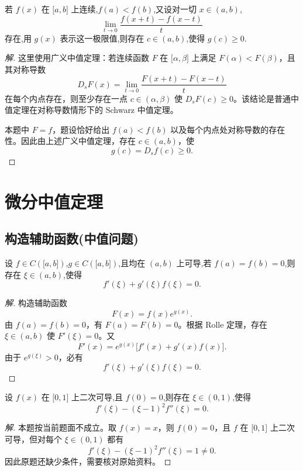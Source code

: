 \documentclass[../../数学分析培优讲义(答案版).tex]{subfiles}
\begin{document}
\begin{example}
若 $f(x)$ 在 $\lbrack a,b\rbrack$ 上连续,$f(a)<f(b)$,又设对一切 $x\in(a,b)$,
\[
    \lim\limits_{t\to0}\dfrac{f(x+t)-f(x-t)}{t}
\]
存在,用 $g(x)$ 表示这一极限值,则存在 $c\in(a,b)$,使得 $g(c)\geq0$.
\end{example}

\begin{proof}[解]
这里使用广义中值定理：若连续函数 $F$ 在 $\lbrack\alpha,\beta\rbrack$ 上满足 $F(\alpha)<F(\beta)$，且其对称导数
\[
    D_sF(x)=\lim\limits_{t\to0}\dfrac{F(x+t)-F(x-t)}{t}
\]
在每个内点存在，则至少存在一点 $c\in(\alpha,\beta)$ 使 $D_sF(c)\geq0$。该结论是普通中值定理在对称导数情形下的 Schwarz 中值定理。

本题中 $F=f$，题设恰好给出 $f(a)<f(b)$ 以及每个内点处对称导数的存在性。因此由上述广义中值定理，存在 $c\in(a,b)$，使
\[
    g(c)=D_sf(c)\geq0.
\]
\end{proof}

\newpage

\section{微分中值定理}

\subsection{构造辅助函数(中值问题)}

\begin{example}
设 $f\in C(\lbrack a,b\rbrack)$,$g\in C(\lbrack a,b\rbrack)$,且均在 $(a,b)$ 上可导,若 $f(a)=f(b)=0$,则存在 $\xi\in(a,b)$,使得
\[
    f'(\xi)+g'(\xi)f(\xi)=0.
\]
\end{example}

\begin{proof}[解]
构造辅助函数
\[
    F(x)=f(x)e^{g(x)}.
\]
由 $f(a)=f(b)=0$，有 $F(a)=F(b)=0$。根据 Rolle 定理，存在 $\xi\in(a,b)$ 使 $F'(\xi)=0$。又
\[
    F'(x)=e^{g(x)}\bigl[f'(x)+g'(x)f(x)\bigr].
\]
由于 $e^{g(\xi)}>0$，必有
\[
    f'(\xi)+g'(\xi)f(\xi)=0.
\]
\end{proof}

\begin{example}
设 $f(x)$ 在 $\lbrack 0,1\rbrack$ 上二次可导,且 $f(0)=0$,则存在 $\xi\in(0,1)$,使得
\[
    f'(\xi)-(\xi-1)^2f''(\xi)=0.
\]
\end{example}

\begin{proof}[解]
本题按当前题面不成立。取 $f(x)=x$，则 $f(0)=0$，且 $f$ 在 $\lbrack0,1\rbrack$ 上二次可导，但对每个 $\xi\in(0,1)$ 都有
\[
    f'(\xi)-(\xi-1)^2f''(\xi)=1\neq0.
\]
因此原题还缺少条件，需要核对原始资料。
\end{proof}
\end{document}
